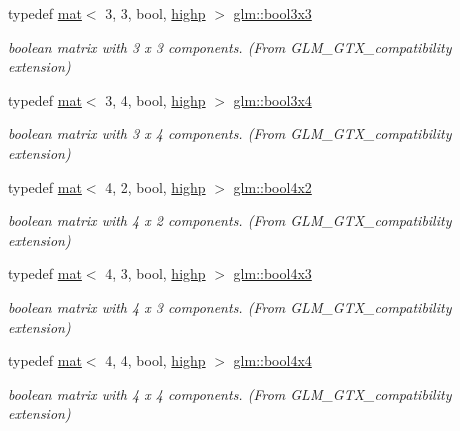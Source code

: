 \begin{DoxyCompactItemize}
typedef \hyperlink{structglm_1_1mat}{mat}$<$ 3, 3, bool, \hyperlink{namespaceglm_a36ed105b07c7746804d7fdc7cc90ff25ac6f7eab42eacbb10d59a58e95e362074}{highp} $>$ \hyperlink{group__gtx__compatibility_gac56217a837f277fa163565d9858f66cf}{glm\+::bool3x3}
\begin{DoxyCompactList}\small\item\em boolean matrix with 3 x 3 components. (From G\+L\+M\+\_\+\+G\+T\+X\+\_\+compatibility extension) \end{DoxyCompactList}\item 
typedef \hyperlink{structglm_1_1mat}{mat}$<$ 3, 4, bool, \hyperlink{namespaceglm_a36ed105b07c7746804d7fdc7cc90ff25ac6f7eab42eacbb10d59a58e95e362074}{highp} $>$ \hyperlink{group__gtx__compatibility_ga3bec11b90dfdd4c6b37af3ae6e8f7c29}{glm\+::bool3x4}
\begin{DoxyCompactList}\small\item\em boolean matrix with 3 x 4 components. (From G\+L\+M\+\_\+\+G\+T\+X\+\_\+compatibility extension) \end{DoxyCompactList}\item 
typedef \hyperlink{structglm_1_1mat}{mat}$<$ 4, 2, bool, \hyperlink{namespaceglm_a36ed105b07c7746804d7fdc7cc90ff25ac6f7eab42eacbb10d59a58e95e362074}{highp} $>$ \hyperlink{group__gtx__compatibility_gaad9844846cb1d1f74c4b00ddb8e582ef}{glm\+::bool4x2}
\begin{DoxyCompactList}\small\item\em boolean matrix with 4 x 2 components. (From G\+L\+M\+\_\+\+G\+T\+X\+\_\+compatibility extension) \end{DoxyCompactList}\item 
typedef \hyperlink{structglm_1_1mat}{mat}$<$ 4, 3, bool, \hyperlink{namespaceglm_a36ed105b07c7746804d7fdc7cc90ff25ac6f7eab42eacbb10d59a58e95e362074}{highp} $>$ \hyperlink{group__gtx__compatibility_gab1a5519fb12e67d9940fa4d9b4590198}{glm\+::bool4x3}
\begin{DoxyCompactList}\small\item\em boolean matrix with 4 x 3 components. (From G\+L\+M\+\_\+\+G\+T\+X\+\_\+compatibility extension) \end{DoxyCompactList}\item 
typedef \hyperlink{structglm_1_1mat}{mat}$<$ 4, 4, bool, \hyperlink{namespaceglm_a36ed105b07c7746804d7fdc7cc90ff25ac6f7eab42eacbb10d59a58e95e362074}{highp} $>$ \hyperlink{group__gtx__compatibility_ga568a1c97a6c6f7253334ee5933a6cb77}{glm\+::bool4x4}
\begin{DoxyCompactList}\small\item\em boolean matrix with 4 x 4 components. (From G\+L\+M\+\_\+\+G\+T\+X\+\_\+compatibility extension) \end{DoxyCompactList}\item 

\end{DoxyCompactItemize}
